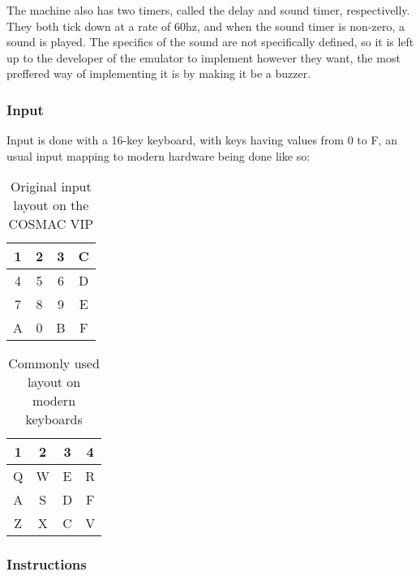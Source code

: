 \par The machine also has two timers, called the delay and sound timer, respectivelly. They both tick down at a rate of 60hz, and when the sound timer is non-zero, a sound is played. The specifics of the sound are not specifically defined, so it is left up to the developer of the emulator to implement however they want, the most preffered way of implementing it is by making it be a buzzer.

\clearpage

\subsubsection{Input}

\par Input is done with a 16-key keyboard, with keys having values from 0 to F, an usual input mapping to modern hardware being done like so:

\begin{table}[H]
\centering
\begin{tabular}{| c | c | c | c |}
\hline
1 & 2 & 3 & C \\ \hline
4 & 5 & 6 & D \\ \hline
7 & 8 & 9 & E \\ \hline
A & 0 & B & F \\ \hline
\end{tabular}
\caption{Original input layout on the COSMAC VIP}
\end{table}

\begin{table}[H]
\centering
\begin{tabular}{| c | c | c | c |}
\hline
1 & 2 & 3 & 4 \\ \hline
Q & W & E & R \\ \hline
A & S & D & F \\ \hline
Z & X & C & V \\ \hline
\end{tabular}
\caption{Commonly used layout on modern keyboards}
\end{table}

\subsubsection{Instructions}

